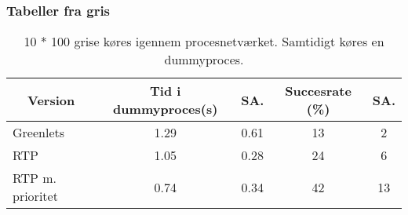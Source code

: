 \documentclass[12pt]{beamer}
\newcommand\mc[1]{\multicolumn{1}{c}{\textbf {#1}}} %
\begin{document}
\begin{frame}
  	\frametitle{Tabeller fra gris}
	\tiny 
	\begin{table}[htbp]
		\centering
		\begin{tabular}{lcccc}
		   	\toprule
		    \mc{Version}&\mc{Tid i dummyproces(s)}&\mc{SA.}& \mc{Succesrate (\%)}&\mc{SA.}\\
		    \midrule
		    Greenlets         & 1.29 & 0.61 & 13 & 2  \\
		    RTP               & 1.05 & 0.28 & 24 & 6  \\
		    RTP m. prioritet  & 0.74 & 0.34 & 42 & 13 \\
		    \bottomrule
		\end{tabular}
		\caption[]{\tiny 10 * 100 grise køres igennem procesnetværket. Samtidigt køres en dummyproces.}
	\end{table}
\end{frame}








\end{document}
